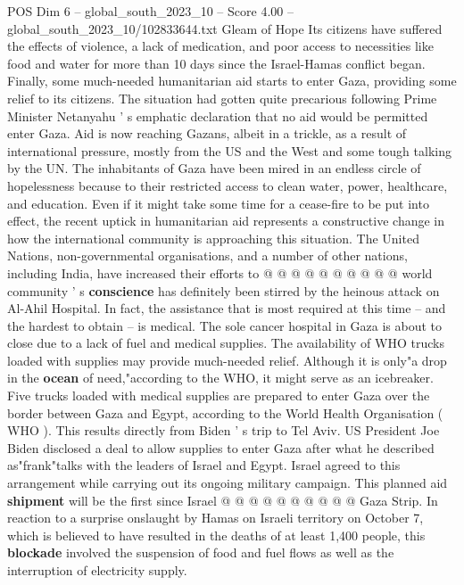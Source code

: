 \begin{textsample}{POS Dim 6 – global\_south\_2023\_10 – Score 4.00 – global\_south\_2023\_10/102833644.txt}  \label{ex:f6_pos_245}
Gleam of Hope Its citizens have suffered the effects of violence, a lack of medication, and poor access to necessities like food and water for more than 10 days since the Israel-Hamas conflict began.
Finally, some much-needed humanitarian aid starts to enter Gaza, providing some relief to its citizens.
The situation had gotten quite precarious following Prime Minister Netanyahu ' s emphatic declaration that no aid would be permitted enter Gaza.
Aid is now reaching Gazans, albeit in a trickle, as a result of international pressure, mostly from the US and the West and some tough talking by the UN.
The inhabitants of Gaza have been mired in an endless circle of hopelessness because to their restricted access to clean water, power, healthcare, and education.
Even if it might take some time for a cease-fire to be put into effect, the recent uptick in humanitarian aid represents a constructive change in how the international community is approaching this situation.
The United Nations, non-governmental organisations, and a number of other nations, including India, have increased their efforts to @ @ @ @ @ @ @ @ @ @ world community ' s \textbf{conscience} has definitely been stirred by the heinous attack on Al-Ahil Hospital.
In fact, the assistance that is most required at this time -- and the hardest to obtain -- is medical.
The sole cancer hospital in Gaza is about to close due to a lack of fuel and medical supplies.
The availability of WHO trucks loaded with supplies may provide much-needed relief.
Although it is only"a drop in the \textbf{ocean} of need,"according to the WHO, it might serve as an icebreaker.
Five trucks loaded with medical supplies are prepared to enter Gaza over the border between Gaza and Egypt, according to the World Health Organisation ( WHO ).
This results directly from Biden ' s trip to Tel Aviv.
US President Joe Biden disclosed a deal to allow supplies to enter Gaza after what he described as"frank"talks with the leaders of Israel and Egypt.
Israel agreed to this arrangement while carrying out its ongoing military campaign.
This planned aid \textbf{shipment} will be the first since Israel @ @ @ @ @ @ @ @ @ @ Gaza Strip.
In reaction to a surprise onslaught by Hamas on Israeli territory on October 7, which is believed to have resulted in the deaths of at least 1,400 people, this \textbf{blockade} involved the suspension of food and fuel flows as well as the interruption of electricity supply.

\end{textsample}
